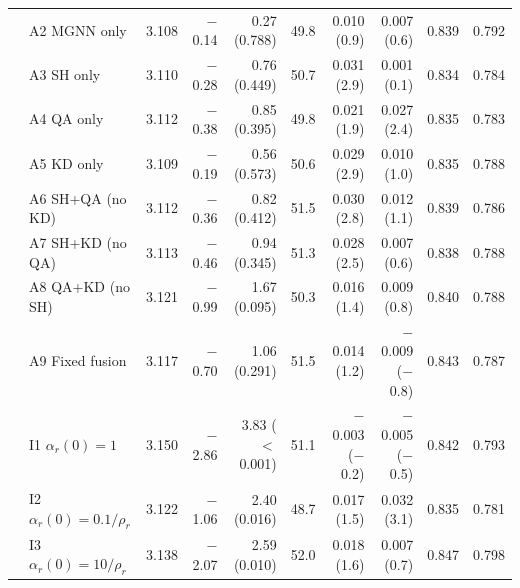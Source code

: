 \begin{table}[!t]
{\begin{tabular}{llrrrrrrrr}
 & A2 MGNN only & 3.108 & $-$0.14 & 0.27 (0.788) & 49.8 & 0.010 (0.9) & 0.007 (0.6) & 0.839 & 0.792 \\
 & A3 SH only & 3.110 & $-$0.28 & 0.76 (0.449) & 50.7 & 0.031 (2.9) & 0.001 (0.1) & 0.834 & 0.784 \\
 & A4 QA only & 3.112 & $-$0.38 & 0.85 (0.395) & 49.8 & 0.021 (1.9) & 0.027 (2.4) & 0.835 & 0.783 \\
 & A5 KD only & 3.109 & $-$0.19 & 0.56 (0.573) & 50.6 & 0.029 (2.9) & 0.010 (1.0) & 0.835 & 0.788 \\
 & A6 SH+QA (no KD) & 3.112 & $-$0.36 & 0.82 (0.412) & 51.5 & 0.030 (2.8) & 0.012 (1.1) & 0.839 & 0.786 \\
 & A7 SH+KD (no QA) & 3.113 & $-$0.46 & 0.94 (0.345) & 51.3 & 0.028 (2.5) & 0.007 (0.6) & 0.838 & 0.788 \\
 & A8 QA+KD (no SH) & 3.121 & $-$0.99 & 1.67 (0.095) & 50.3 & 0.016 (1.4) & 0.009 (0.8) & 0.840 & 0.788 \\
 & A9 Fixed fusion & 3.117 & $-$0.70 & 1.06 (0.291) & 51.5 & 0.014 (1.2) & $-$0.009 ($-$0.8) & 0.843 & 0.787 \\
 & I1 $\alpha_r(0)=1$ & 3.150 & $-$2.86 & 3.83 ($<$0.001) & 51.1 & $-$0.003 ($-$0.2) & $-$0.005 ($-$0.5) & 0.842 & 0.793 \\
 & I2 $\alpha_r(0)=0.1/\rho_r$ & 3.122 & $-$1.06 & 2.40 (0.016) & 48.7 & 0.017 (1.5) & 0.032 (3.1) & 0.835 & 0.781 \\
 & I3 $\alpha_r(0)=10/\rho_r$ & 3.138 & $-$2.07 & 2.59 (0.010) & 52.0 & 0.018 (1.6) & 0.007 (0.7) & 0.847 & 0.798 \\
\bottomrule
\end{tabular}}
\end{table}